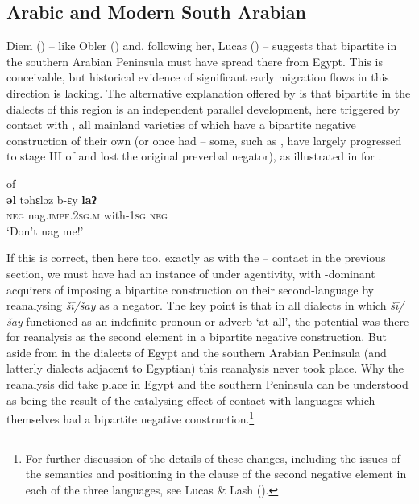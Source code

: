 \documentclass[output=paper]{langsci/langscibook}
\begin{document}
\subsection{Arabic and Modern South Arabian}


Diem (\citeyear[73]{Diem2014}) -- like Obler (\citeyear[148]{Obler1990}) and, following her, Lucas (\citeyear[416]{Lucas2007}) -- suggests that bipartite  in the southern Arabian Peninsula must have spread there from Egypt. This is conceivable, but historical evidence of significant early migration flows in this direction is lacking. The alternative explanation offered by \citet{LucasLash2010} is that bipartite  in the  dialects of this region is an independent parallel development, here triggered by contact with , all mainland varieties of which have a bipartite negative construction of their own (or once had – some, such as , have largely progressed to stage III of  and lost the original preverbal negator), as illustrated in  for  .

\ea\label{meh1}
{        of  \citep[23]{Johnstone1987}}\\
\gll \textbf{əl} təhɛləz b-ɛy \textbf{laʔ}\\
     \textsc{neg} nag.\textsc{impf.2sg.m} with-\textsc{1sg} \textsc{neg} \\
\glt ‘Don’t nag me!’
\z

If this is correct, then here too, exactly as with the – contact in the previous section, we must have had an instance of  under  agentivity, with -dominant acquirers of  imposing a bipartite construction on their second-language  by reanalysing \textit{šī/šay} as a negator. The key point is that in all dialects in which \textit{šī/šay} functioned as an indefinite pronoun or adverb ‘at all’, the potential was there for reanalysis as the second element in a bipartite negative construction. But aside from in the dialects of Egypt and the southern Arabian Peninsula (and latterly dialects adjacent to Egyptian) this reanalysis never took place. Why the reanalysis did take place in Egypt and the southern Peninsula can be understood as being the result of the catalysing effect of contact with languages which themselves had a bipartite negative construction.\footnote{For further discussion of the details of these changes, including the issues of the semantics and positioning in the clause of the second negative element in each of the three languages, see Lucas \& Lash (\citeyear[395–401]{LucasLash2010}).}
\end{document}
